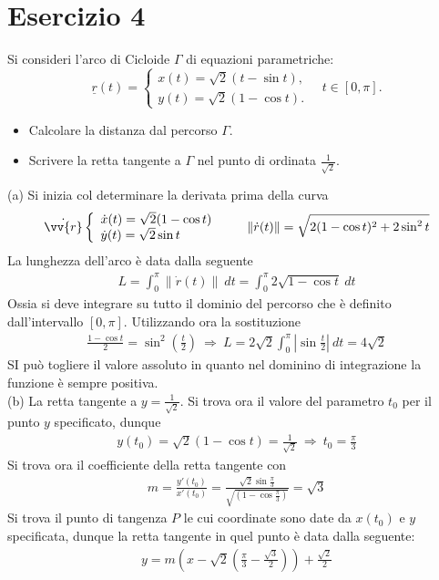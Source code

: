 \documentclass[a4paper, oneside]{book}
\begin{document}
\section{Esercizio 4}
Si consideri l'arco di Cicloide $\Gamma$ di equazioni parametriche:
\[ \underline{r}(t)=\begin{cases}x(t)=\sqrt{2}(t-\sin t),\\ y(t)=\sqrt{2}(1-\cos t).\end{cases} \quad t\in[0,\pi]. \]
\begin{itemize}
    \item[(a)] Calcolare la distanza dal percorso $\Gamma$.
    \item[(b)] Scrivere la retta tangente a $\Gamma$ nel punto di ordinata $\frac{1}{\sqrt{2}}$.
\end{itemize} \noindent
(a) Si inizia col determinare la derivata prima della curva
\begin{gather*}
    \dot{\vv{r} } \left\{\begin{array}{l}
        \dot{x}(t) = \sqrt{2}(1 - \cos t) \\
        \dot{y}(t) = \sqrt{2}\sin t    
    \end{array}\right. \qquad \left\lVert \dot{r}(t)  \right\rVert = \sqrt{2(1 - \cos t)^{2} + 2\sin^{2}t} 
\end{gather*}
La lunghezza dell'arco è data dalla seguente
\begin{gather*}
    L = \int_{0}^{\pi} \left\lVert \dot{r}(t)  \right\rVert  \ dt = \int_{0}^{\pi} 2\sqrt{1 - \cos t} \ dt  
\end{gather*}
Ossia si deve integrare su tutto il dominio del percorso che è
definito dall'intervallo $[0, \pi]$. Utilizzando ora la sostituzione
\begin{gather*}
    \frac{1 - \cos t}{2} = \sin^{2} \left(\frac{t}{2}\right) \ \Longrightarrow \ L = 2\sqrt{2}\int_{0}^{\pi}\left| \sin\frac{t}{2} \right| \ dt  = 4\sqrt{2}   
\end{gather*}
SI può togliere il valore assoluto in quanto nel dominino di integrazione la funzione è sempre positiva. \\
(b) La retta tangente a $y = \frac{1}{\sqrt{2} }$. Si trova ora il valore del parametro 
$t_0$ per il punto $y$ specificato, dunque
\begin{gather*}
    y(t_0) = \sqrt{2}(1 - \cos t) = \frac{1}{\sqrt{2} } \ \Longrightarrow \ t_0 = \frac{\pi}{3} 
\end{gather*}
Si trova ora il coefficiente della retta tangente con
\begin{gather*}
    m = \frac{y'(t_0)}{x'(t_0)} = \frac{\sqrt{2} \sin\frac{\pi}{3} }{\sqrt{(1 - \cos\frac{\pi}{3})} } = \sqrt{3} 
\end{gather*}
Si trova il punto di tangenza $P$ le cui coordinate sono date da $x(t_0)$ e $y$ specificata, 
dunque la retta tangente in quel punto è data dalla seguente:
\begin{gather*}
    y = m\left(x - \sqrt{2}\left(\frac{\pi}{3} - \frac{\sqrt{3} }{2}\right) \right) + \frac{\sqrt{2} }{2}
\end{gather*}
\end{document}
